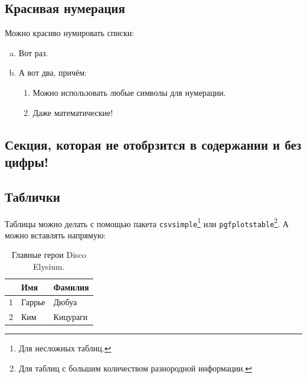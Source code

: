 \documentclass[12pt,a4paper]{article}
\begin{document}
\subsection{Красивая нумерация}

Можно красиво нумировать списки:

\begin{enumerate}[(a)]
    \item Вот раз.
    \item А вот два, причём:
    \begin{enumerate}[1 $\to$]
    	\item Можно использовать любые символы для нумерации.
    	\item Даже математические!
    \end{enumerate}
\end{enumerate}


\subsection*{Секция, которая не отобрзится в содержании и без цифры!}

\textcolor{gray}{}


\subsection{Таблички}

Таблицы можно делать с помощью пакета \texttt{csvsimple}\footnote{Для несложных таблиц.} или \texttt{pgfplotstable}\footnote{Для таблиц с большим количеством разнородной информации.}. А можно вставлять напрямую:

\begin{table}[h!]
	\centering
	\begin{tabular}{|c|l|l|} \hline
		& \textbf{Имя} & \textbf{Фамилия} \\ \hline
		1 & Гаррье & Дюбуа \\ \hline
		2 & Ким & Кицураги \\ \hline
	\end{tabular}
	\caption{Главные герои Disco Elysium.}
	\label{table:disco_main_characters}
\end{table}
\end{document}
